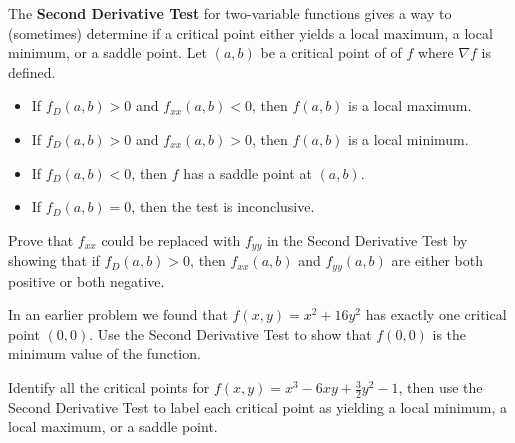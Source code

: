 \documentclass[letterpaper, twoside, 12pt]{book}
\begin{document}
\begin{theorem}
  The \textbf{Second Derivative Test} for two-variable functions gives
  a way to (sometimes) determine if a critical point either yields a
  local maximum, a local minimum, or a saddle point.
  Let $(a,b)$ be a critical point of of $f$ where $\nabla f$ is defined.
    \begin{itemize}
      \item If $f_D(a,b)>0$ and $f_{xx}(a,b)<0$,
            then $f(a,b)$ is a local maximum.
      \item If $f_D(a,b)>0$ and $f_{xx}(a,b)>0$,
            then $f(a,b)$ is a local minimum.
      \item If $f_D(a,b)<0$,
            then $f$ has a saddle point at $(a,b)$.
      \item If $f_D(a,b)=0$,
            then the test is inconclusive.
    \end{itemize}
\end{theorem}

          \begin{problem}
            Prove that $f_{xx}$ could be replaced with $f_{yy}$ in the
            Second Derivative Test by showing that if $f_D(a,b)>0$,
            then $f_{xx}(a,b)$ and $f_{yy}(a,b)$ are either both positive
            or both negative.
          \end{problem}

          \begin{solution}

          \end{solution}

          \begin{problem}
            In an earlier problem we found that $f(x,y)=x^2+16y^2$ has exactly
            one critical point $(0,0)$. Use the Second Derivative Test
            to show that $f(0,0)$ is the minimum value of the function.
          \end{problem}

          \begin{solution}

          \end{solution}

          \begin{problem}
            Identify all the critical points for
            $f(x,y)=x^3-6xy+\frac{3}{2}y^2-1$, then use the Second Derivative
            Test to label each critical point as yielding a local minimum,
            a local maximum, or a saddle point.
          \end{problem}
\end{document}
